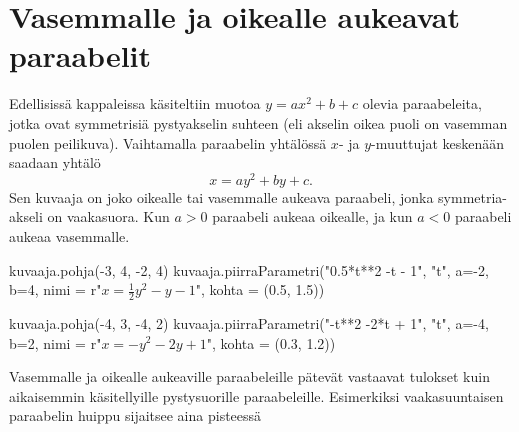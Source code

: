 \section{Vasemmalle ja oikealle aukeavat paraabelit}




Edellisissä kappaleissa käsiteltiin muotoa $y = ax^2 + b + c$ olevia paraabeleita, jotka ovat symmetrisiä pystyakselin suhteen (eli akselin oikea puoli on vasemman puolen peilikuva). Vaihtamalla paraabelin yhtälössä $x$- ja $y$-muuttujat keskenään saadaan yhtälö
\[x=ay^2+by+c.\]
Sen kuvaaja on joko oikealle tai vasemmalle aukeava paraabeli, jonka symmetria-akseli on vaakasuora. Kun $a>0$ paraabeli aukeaa oikealle, ja kun $a < 0$ paraabeli aukeaa vasemmalle.


\begin{kuva}
    kuvaaja.pohja(-3, 4, -2, 4)
    kuvaaja.piirraParametri("0.5*t**2 -t - 1", "t", a=-2, b=4, nimi = r"$x = \frac{1}{2}y^2  - y -1$", kohta = (0.5, 1.5))
\end{kuva}


\begin{kuva}
    kuvaaja.pohja(-4, 3, -4, 2)
    kuvaaja.piirraParametri("-t**2 -2*t + 1", "t", a=-4, b=2, nimi = r"$x = -y^2 - 2y +1$", kohta = (0.3, 1.2))
\end{kuva}



Vasemmalle ja oikealle aukeaville paraabeleille pätevät vastaavat tulokset kuin aikaisemmin käsitellyille pystysuorille paraabeleille. Esimerkiksi vaakasuuntaisen paraabelin huippu sijaitsee aina pisteessä

